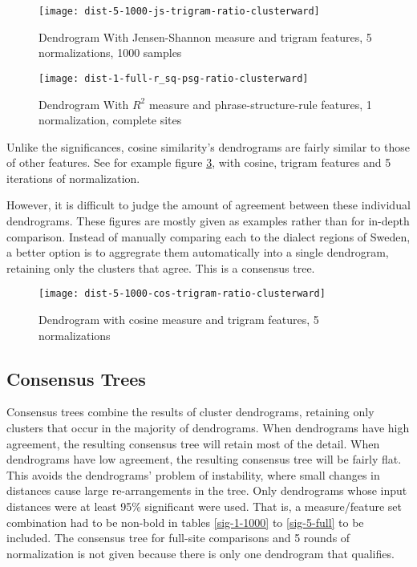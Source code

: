 \begin{figure}
  \texttt{[image: dist-5-1000-js-trigram-ratio-clusterward]}
 \caption{Dendrogram With Jensen-Shannon
    measure and trigram features, 5 normalizations, 1000 samples}
  \label{cluster-5-js-trigram}
\end{figure}


\begin{figure}
  \texttt{[image: dist-1-full-r\_sq-psg-ratio-clusterward]}
 \caption{Dendrogram With $R^2$ measure and phrase-structure-rule features,
 1 normalization, complete sites}
  \label{cluster-1-r_sq-psg}
\end{figure}




Unlike the significances, cosine similarity's dendrograms are fairly
similar to those of other features. See for example figure
\ref{cluster-5-cos-trigram}, with cosine, trigram features and
5 iterations of normalization.

However, it is difficult to judge the amount of agreement between
these individual dendrograms. These figures are mostly given as
examples rather than for in-depth comparison. Instead of manually
comparing each to the dialect regions of Sweden, a better option is to
aggregrate them automatically into a single dendrogram, retaining only
the clusters that agree. This is a consensus tree.

\begin{figure}
 \texttt{[image: dist-5-1000-cos-trigram-ratio-clusterward]}
 \caption{Dendrogram with cosine measure and trigram features, 5
   normalizations}
  \label{cluster-5-cos-trigram}
\end{figure}


\subsection{Consensus Trees}
\label{section-consensus}

Consensus trees combine the results of cluster dendrograms, retaining
only clusters that occur in the majority of dendrograms. When
dendrograms have high agreement, the resulting consensus tree will
retain most of the detail. When dendrograms have low agreement, the
resulting consensus tree will be fairly flat.  This avoids the
dendrograms' problem of instability, where small changes in distances
cause large re-arrangements in the tree. Only dendrograms whose input
distances were at least 95\% significant were used. That is, a
measure/feature set combination had to be non-bold in tables
\ref{sig-1-1000} to \ref{sig-5-full} to be included. The consensus
tree for full-site comparisons and 5 rounds of normalization is not
given because there is only one dendrogram that qualifies.

